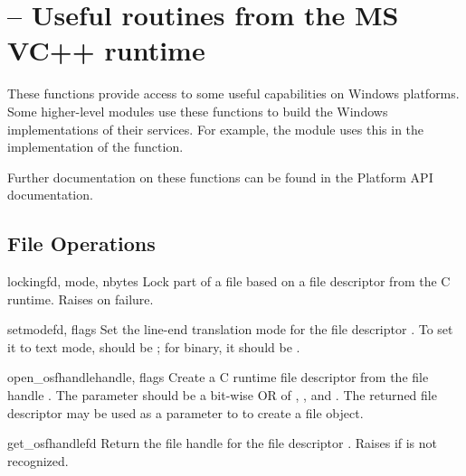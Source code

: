 \section{ --
         Useful routines from the MS VC++ runtime}



These functions provide access to some useful capabilities on Windows
platforms.  Some higher-level modules use these functions to build the 
Windows implementations of their services.  For example, the
 module uses this in the implementation of the
 function.

Further documentation on these functions can be found in the Platform
API documentation.


\subsection{File Operations \label{msvcrt-files}}

\begin{funcdesc}{locking}{fd, mode, nbytes}
  Lock part of a file based on a file descriptor from the C runtime.
  Raises  on failure.
\end{funcdesc}

\begin{funcdesc}{setmode}{fd, flags}
  Set the line-end translation mode for the file descriptor .
  To set it to text mode,  should be ;
  for binary, it should be .
\end{funcdesc}

\begin{funcdesc}{open_osfhandle}{handle, flags}
  Create a C runtime file descriptor from the file handle
  .  The  parameter should be a bit-wise OR of
  , , and
  .  The returned file descriptor may be used as a
  parameter to  to create a file object.
\end{funcdesc}

\begin{funcdesc}{get_osfhandle}{fd}
  Return the file handle for the file descriptor .  Raises
   if  is not recognized.
\end{funcdesc}


